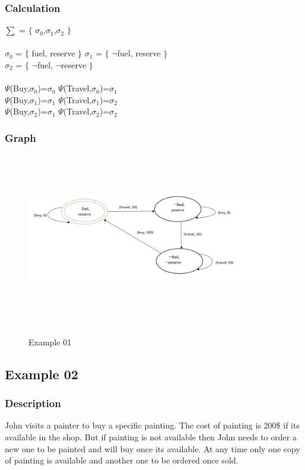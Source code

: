 \documentclass[11pt]{article}
\begin{document}
	\subsubsection{Calculation}\label{par:p301}\par
	$\sum$ = $\lbrace$ $\sigma_{0}$,$\sigma_{1}$,$\sigma_{2}$ $\rbrace$\\ \\
	$\sigma_{0}$ = $\lbrace$ fuel, reserve $\rbrace$ \indent $\sigma_{1}$ = $\lbrace$ $\neg$fuel, reserve $\rbrace$\\
	$\sigma_{2}$ = $\lbrace$ $\neg$fuel, $\neg$reserve $\rbrace$ 
	\\ \\
	$\Psi$(Buy,$\sigma_{0}$)=$\sigma_{0}$ \indent $\Psi$(Travel,$\sigma_{0}$)=$\sigma_{1}$\\
	$\Psi$(Buy,$\sigma_{1}$)=$\sigma_{1}$ \indent $\Psi$(Travel,$\sigma_{1}$)=$\sigma_{2}$\\
	$\Psi$(Buy,$\sigma_{2}$)=$\sigma_{1}$ \indent $\Psi$(Travel,$\sigma_{2}$)=$\sigma_{2}$\\
	\subsubsection{Graph}\label{par:p401}
	\begin{figure}[H]
		\centering
		\includegraphics[width=6in,height=3in]{./media/ex01.png}
		\label{Figure:f01}
		\caption{Example 01}
	\end{figure}
	\subsection{Example 02}\label{example:ex02}
	\subsubsection{Description}\label{par:p102}
	John visits a painter to buy a specific painting. The cost of painting is 200\$ if its available in the shop. But if painting is not available then John needs to order a new one to be painted and will buy once its available. At any time only one copy of painting is available and another one to be ordered once sold. 
	
\end{document}
